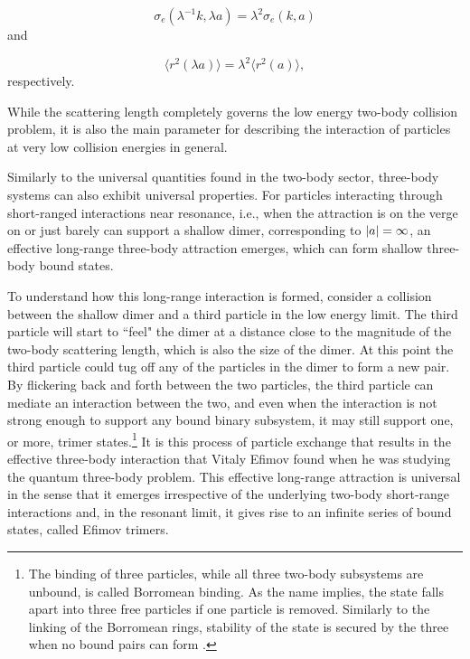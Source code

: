 \begin{equation}
\sigma_e(\lambda^{-1}k,\lambda a) = \lambda^2 \sigma_e(k,a)
\end{equation}
and

\begin{equation}
\langle r^2(\lambda a)\rangle = \lambda^2 \langle r^2(a)\rangle ,
\end{equation}
respectively. 

While the scattering length completely governs the low energy two-body collision problem, it is also the main parameter for describing the interaction of particles at very low collision energies in general. 

Similarly to the universal quantities found in the two-body sector, three-body systems can also exhibit universal properties. For particles interacting through short-ranged interactions near resonance, i.e., when the attraction is on the verge on or just barely can support a shallow dimer, corresponding to $\lvert a\rvert=\infty$, an effective long-range three-body attraction emerges, which can form shallow three-body bound states.

To understand how this long-range interaction is formed, consider a collision between the shallow dimer and a third particle in the low energy limit. The third particle will start to ``feel" the dimer at a distance close to the magnitude of the two-body scattering length, which is also the size of the dimer. At this point the third particle could tug off any of the particles in the dimer to form a new pair. By flickering back and forth between the two particles, the third particle can mediate an interaction between the two, and even when the interaction is not strong enough to support any bound binary subsystem, it may still support one, or more, trimer states.\footnote{The binding of three particles, while all three two-body subsystems are unbound, is called Borromean binding. As the name implies, the state falls apart into three free particles if one particle is removed. Similarly to the linking of the Borromean rings, stability of the state is secured by the three when no bound pairs can form \cite{Kajsa_my}.} It is this process of particle exchange that results in the effective three-body interaction that Vitaly Efimov found when he was studying the quantum three-body problem. This effective long-range attraction is universal in the sense that it emerges irrespective of the underlying two-body short-range interactions and, in the resonant limit, it gives rise to an infinite series of bound states, called Efimov trimers.

